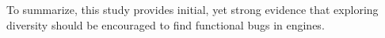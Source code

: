 \vspace{1ex} To summarize, this study provides initial, yet strong evidence
that exploring diversity should be encouraged to find functional bugs
in \js{} engines. 
 






	







    
